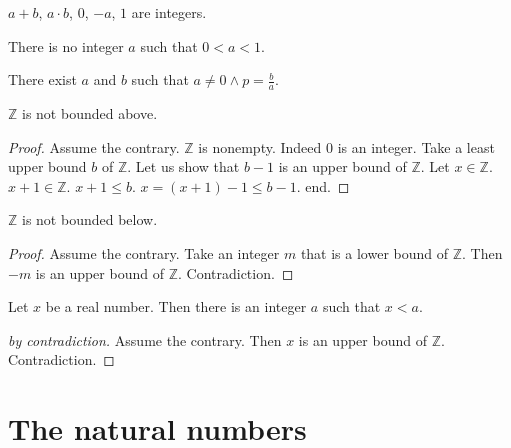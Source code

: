 \documentclass{article}
\begin{document}
\begin{forthel}

\begin{axiom}
$a + b$, $a \cdot b$, $0$, $-a$, $1$ are integers.
\end{axiom}

\begin{axiom}
There is no integer $a$ such that $0 < a < 1$.
\end{axiom}

\begin{axiom}
There exist $a$ and $b$ such that
$a \neq 0 \wedge p = \frac{b}{a}$.
\end{axiom}

\begin{theorem}[Archimedes1]
$\mathbb{Z}$ is not bounded above.
\end{theorem}
\begin{proof}
Assume the contrary.
$\mathbb{Z}$ is nonempty. Indeed $0$ is an integer.
Take a least upper bound
$b$ of $\mathbb{Z}$.
Let us show that $b - 1$ is an upper bound of $\mathbb{Z}$.
Let $x \in \mathbb{Z}$. $x + 1 \in \mathbb{Z}$.
$x + 1 \leq b$.
$x = (x + 1) - 1 \leq b - 1$.
end.
\end{proof}

\begin{theorem}
$\mathbb{Z}$ is not bounded below.
\end{theorem}
\begin{proof}
Assume the contrary.
Take an integer $m$ that is a lower bound of $\mathbb{Z}$.
Then $-m$ is an upper bound of $\mathbb{Z}$.
Contradiction.
\end{proof}

\begin{theorem}[Archimedes2]
Let $x$ be a real number.
Then there is an integer $a$
such that $x < a$.\end{theorem}
\begin{proof}[by contradiction]
Assume the contrary.
Then $x$ is an upper bound of $\mathbb{Z}$.
Contradiction.
\end{proof}

\end{forthel}


\section{The natural numbers}
\end{document}
